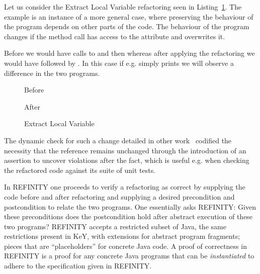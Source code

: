 Let us consider the Extract Local Variable refactoring seen in Listing~\ref{lst:ExtractVariable-java}.
The example is an instance of a more general case, where preserving the behaviour of the program depends on other parts of the code.
The behaviour of the program changes if the method call  has access to the attribute  and overwrites it.

Before we would have calls to  and then  whereas after applying the refactoring we would
have  followed by . In this case if e.g.  simply prints  we will
observe a difference in the two programs.

\begin{figure}[tbp]
  \captionsetup{type=lstlisting}
  \centering
  \begin{sublstlisting}{.2\linewidth}
    
    \caption{Before}
  \end{sublstlisting}\hspace{1cm}
  \begin{sublstlisting}{.3\linewidth}
    
    \caption{After}
  \end{sublstlisting}
  \caption{Extract Local Variable}
  \label{lst:ExtractVariable-java}
\end{figure}

The dynamic check for such a change detailed in other work~\cite{stolz:isolarefa} codified the necessity that the reference 
remains unchanged through the introduction of an assertion  to uncover violations after the fact,
which is useful e.g. when checking the refactored code against its suite of unit tests.

In REFINITY one proceeds to verify a refactoring as correct by supplying the code before and after refactoring and supplying a desired precondition and postcondition to relate
the two programs. One essentially asks REFINITY: Given these preconditions does the postcondition hold after abstract execution of these two programs? REFINITY accepts a restricted
subset of Java, the same restrictions present in KeY, with extensions for abstract program fragments; pieces that are ``placeholders'' for concrete Java code.
A proof of correctness in REFINITY is a proof for any concrete Java programs that can be \emph{instantiated} to adhere to the specification given in REFINITY.

